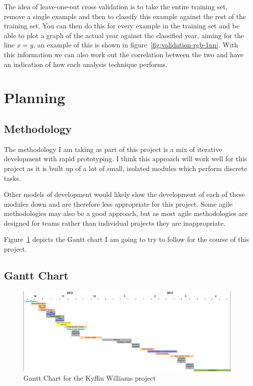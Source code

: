 \documentclass[11pt,fleqn,twoside]{article}
\begin{document}
The idea of leave-one-out cross validation is to take the entire training set, remove a single 
example and then to classify this example against the rest of the training set. You can then do
this for every example in the training set and be able to plot a graph of the actual year against
the classified year, aiming for the line $x=y$, an example of this is shown in 
figure~\ref{fig:validation-rgb-1nn}. With this information we can also work out the correlation 
between the two and have an indication of how each analysis technique performs.


\clearpage
\section{Planning}

\subsection{Methodology}
The methodology I am taking as part of this project is a mix of iterative development with rapid
prototyping. I think this approach will work well for this project as it is built up of a lot of 
small, isolated modules which perform discrete tasks.

Other models of development would likely slow the development of each of these modules down and are
therefore less appropriate for this project. Some agile methodologies may also be a good approach,
but as most agile methodologies are designed for teams rather than individual projects they are
inappropriate.

Figure~\ref{fig:gantt} depicts the Gantt chart I am going to try to follow for the course of this
project.


\clearpage
\newpage
\subsection{Gantt Chart}
\begin{figure}[H]
\centering
\includegraphics[scale=0.45, angle=90]{img/gantt.png}
\caption{Gantt Chart for the Kyffin Williams project}
\label{fig:gantt}
\end{figure}
\end{document}
